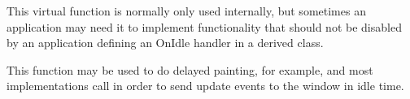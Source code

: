

\label{wxwindowoninternalidle}


This virtual function is normally only used internally, but
sometimes an application may need it to implement functionality
that should not be disabled by an application defining an OnIdle
handler in a derived class.

This function may be used to do delayed painting, for example,
and most implementations call 
in order to send update events to the window in idle time.


